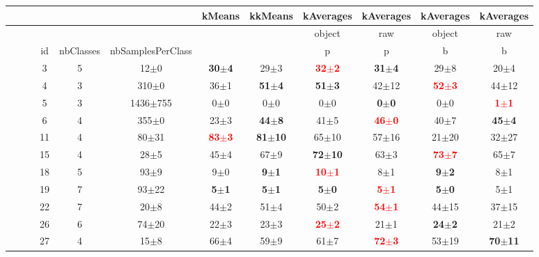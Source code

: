 \documentclass[12pt,a4paper,fleqn]{tufte-handout}
\begin{document}
 
\begin{table}   
\begin{center}   
\small   
\setlength{\tabcolsep}{.16667em}   
\begin{tabular}{lllccccccccc}   
&  &  &  &  &  & kMeans & kkMeans & kAverages & kAverages & kAverages & kAverages \\   
\hline   
&  &  &  &  &  &  &  & object & raw & object & raw \\   
&  &  & id & nbClasses & nbSamplesPerClass &  &  & p & p & b & b \\   
&  &  &  3 & 5 &      12$\pm$0 & \textbf{30$\pm$4} & 29$\pm$3 & \textbf{\textcolor{red}{32$\pm$2}} & \textbf{31$\pm$4} & 29$\pm$8 & 20$\pm$4 \\   
&  &  &  4 & 3 &     310$\pm$0 &  36$\pm$1 & \textbf{ 51$\pm$4} & \textbf{ 51$\pm$3} & 42$\pm$12 & \textbf{\textcolor{red}{ 52$\pm$3}} & 44$\pm$12 \\   
&  &  &  5 & 3 &  1436$\pm$755 & 0$\pm$0 & 0$\pm$0 & 0$\pm$0 & \textbf{0$\pm$0} & 0$\pm$0 & \textbf{\textcolor{red}{1$\pm$1}} \\   
&  &  &  6 & 4 &     355$\pm$0 & 23$\pm$3 & \textbf{44$\pm$8} & 41$\pm$5 & \textbf{\textcolor{red}{46$\pm$0}} & 40$\pm$7 & \textbf{45$\pm$4} \\   
&  &  & 11 & 4 &     80$\pm$31 & \textbf{\textcolor{red}{ 83$\pm$3}} & \textbf{81$\pm$10} & 65$\pm$10 & 57$\pm$16 & 21$\pm$20 & 32$\pm$27 \\   
&  &  & 15 & 4 &      28$\pm$5 &  45$\pm$4 &  67$\pm$9 & \textbf{72$\pm$10} &  63$\pm$3 & \textbf{\textcolor{red}{ 73$\pm$7}} &  65$\pm$7 \\   
&  &  & 18 & 5 &      93$\pm$9 &  9$\pm$0 & \textbf{ 9$\pm$1} & \textbf{\textcolor{red}{10$\pm$1}} &  8$\pm$1 & \textbf{ 9$\pm$2} &  8$\pm$1 \\   
&  &  & 19 & 7 &     93$\pm$22 & \textbf{5$\pm$1} & \textbf{5$\pm$1} & \textbf{5$\pm$0} & \textbf{\textcolor{red}{5$\pm$1}} & \textbf{5$\pm$0} & 5$\pm$1 \\   
&  &  & 22 & 7 &      20$\pm$8 &  44$\pm$2 &  51$\pm$4 &  50$\pm$2 & \textbf{\textcolor{red}{ 54$\pm$1}} & 44$\pm$15 & 37$\pm$15 \\   
&  &  & 26 & 6 &     74$\pm$20 & 22$\pm$3 & 23$\pm$3 & \textbf{\textcolor{red}{25$\pm$2}} & 21$\pm$1 & \textbf{24$\pm$2} & 21$\pm$2 \\   
&  &  & 27 & 4 &      15$\pm$8 &  66$\pm$4 &  59$\pm$9 &  61$\pm$7 & \textbf{\textcolor{red}{ 72$\pm$3}} & 53$\pm$19 & \textbf{70$\pm$11} \\   

\end{tabular}
\end{center}
\end{table}
\end{document}
